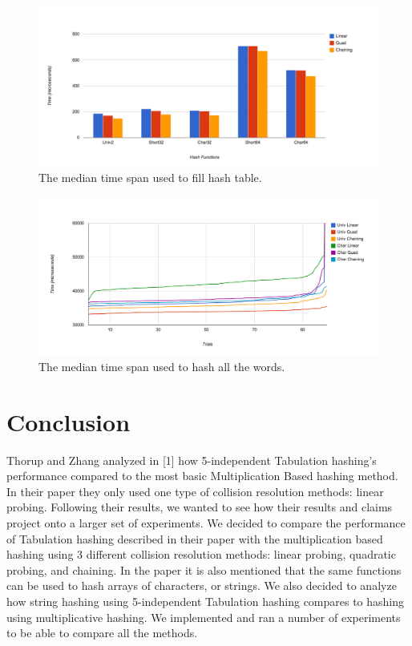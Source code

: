 \documentclass[11pt]{article}
\begin{document}
\begin{figure}
                \centering
                \includegraphics[width=\textwidth]{time-median.png}
              \caption{The median time span used to fill hash table.}
              \label{fig:timemedian}
\end{figure}


\begin{figure}
                \centering
                \includegraphics[width=\textwidth]{string-time.png}
              \caption{The median time span used to hash all the words.}
              \label{fig:string-time}
\end{figure}



\section{Conclusion}
Thorup and Zhang analyzed in [1] how 5-independent Tabulation hashing's performance compared to the most basic Multiplication Based hashing method. In their paper they only used one type of collision resolution methods: linear probing. Following their results, we wanted to see how their results and claims project onto a larger set of experiments. We decided to compare the performance of Tabulation hashing described in their paper with the multiplication based hashing using 3 different collision resolution methods: linear probing, quadratic probing, and chaining. In the paper it is also mentioned that the same functions can be used to hash arrays of characters, or strings. We also decided to analyze how string hashing using 5-independent Tabulation hashing compares to hashing using multiplicative hashing. We implemented and ran a number of experiments to be able to compare all the methods. 
\end{document}
